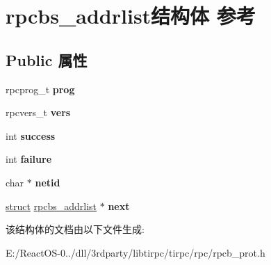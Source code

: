 \hypertarget{structrpcbs__addrlist}{}\section{rpcbs\+\_\+addrlist结构体 参考}
\label{structrpcbs__addrlist}
\subsection*{Public 属性}
\begin{DoxyCompactItemize}
\item 
\mbox{\label{structrpcbs__addrlist_af52f9ff5ec8a9aae4ba58e405dfd16e8}} 
rpcprog\+\_\+t {\bfseries prog}
\item 
\mbox{\label{structrpcbs__addrlist_aa21735e3bc7d1a7c5f01c7ee3cd4abe9}} 
rpcvers\+\_\+t {\bfseries vers}
\item 
\mbox{\label{structrpcbs__addrlist_aa257db61fe386a2f407f15f50377caa2}} 
int {\bfseries success}
\item 
\mbox{\label{structrpcbs__addrlist_a22de02a8fef25d0b589bf50c33d09c64}} 
int {\bfseries failure}
\item 
\mbox{\label{structrpcbs__addrlist_afa754c3f6e878d5c86d80809254dcb59}} 
char $\ast$ {\bfseries netid}
\item 
\mbox{\label{structrpcbs__addrlist_aafe8575ce2b7ee3a405a9dae9cfdad7b}} 
\hyperlink{interfacestruct}{struct} \hyperlink{structrpcbs__addrlist}{rpcbs\+\_\+addrlist} $\ast$ {\bfseries next}
\end{DoxyCompactItemize}


该结构体的文档由以下文件生成\+:\begin{DoxyCompactItemize}
\item 
E\+:/\+React\+O\+S-\/0../dll/3rdparty/libtirpc/tirpc/rpc/rpcb\+\_\+prot.\+h\end{DoxyCompactItemize}
